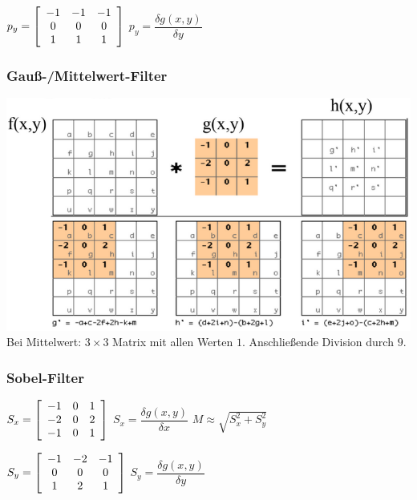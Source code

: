 \documentclass[8pt,a4paper,landscape]{scrartcl}
\begin{document}
\begin{multicols*}{3}
$
p_y = \left[\begin{Array}{ccc}
	-1 & -1 & -1\\
	0 & 0 & 0\\
	1 & 1 & 1\\
\end{Array}\right]
$
\hspace{1cm}
$ p_y = \dfrac{\delta g(x,y)}{\delta y} $


\subsubsection*{Gauß-/Mittelwert-Filter}

\includegraphics[width=\columnwidth]{Gauss}
Bei Mittelwert: $ 3\times 3 $ Matrix mit allen Werten $ 1 $. Anschließende Division durch $ 9 $.
\subsubsection*{Sobel-Filter}
$
S_x = \left[\begin{Array}{ccc}
	-1 & 0 & 1\\
	-2 & 0 & 2\\
	-1 & 0 & 1\\
\end{Array}\right]
$
\hspace{1cm}
$
S_x = \dfrac{\delta g(x,y)}{\delta x}
$
\hspace{1cm}
$ M \approx \sqrt{S_x^2 + S_y^2} $

$
S_y = \left[\begin{Array}{ccc}
	-1 & -2 & -1\\
	0 & 0 & 0\\
	1 & 2 & 1\\
\end{Array}\right]
$
\hspace{1cm}
$ S_y = \dfrac{\delta g(x,y)}{\delta y} $

\end{multicols*}
\end{document}
